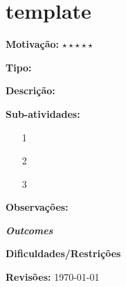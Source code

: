 \chapter{template}

\textbf{Motivação:} $\star\star\star\star\star$

\textbf{Tipo:}

\textbf{Descrição:}

\textbf{Sub-atividades:}

\begin{itemize}
	\item[1]
	\item[2]
	\item[3]
\end{itemize}

\textbf{Observações:}

\textbf{\textit{Outcomes}}

\textbf{Dificuldades/Restrições}

\textbf{Revisões:}
\today
